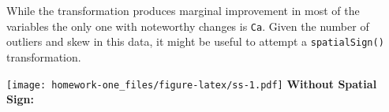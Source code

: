 \documentclass[openany]{book}
\newenvironment{Shaded}{\begin{snugshade}}{\end{snugshade}}
\newcommand{\DataTypeTok}[1]{\textcolor[rgb]{0.13,0.29,0.53}{#1}}
\newcommand{\DecValTok}[1]{\textcolor[rgb]{0.00,0.00,0.81}{#1}}
\newcommand{\KeywordTok}[1]{\textcolor[rgb]{0.13,0.29,0.53}{\textbf{#1}}}
\newcommand{\NormalTok}[1]{#1}
\newcommand{\OperatorTok}[1]{\textcolor[rgb]{0.81,0.36,0.00}{\textbf{#1}}}
\newcommand{\StringTok}[1]{\textcolor[rgb]{0.31,0.60,0.02}{#1}}
\begin{document}
While the transformation produces marginal improvement in most of the variables the only one with noteworthy changes is \texttt{Ca}. Given the number of outliers and skew in this data, it might be useful to attempt a \texttt{spatialSign()} transformation.

\begin{Shaded}
\end{Shaded}

\texttt{[image: homework-one\_files/figure-latex/ss-1.pdf]}
\textbf{Without Spatial Sign:}

\begin{Shaded}
\end{Shaded}

\begingroup\fontsize{10}{12}\selectfont
\end{document}
